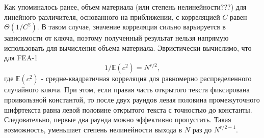 \documentclass[utf8x, 14pt]{G7-32} %
\begin{document}
Как упоминалось ранее, объем материала (или степень нелинейности???) для линейного различителя, основанного на приближении, с корреляцией $C$ равен $\Theta (1/C^2)$. В таком случае, значение корреляция сильно варьируется в зависимости от ключа, поэтому полученный результат нельзя напрямую использовать для вычисления объема материала. Эвристически вычислимо, что для FEA-1
\begin{equation}
\label{eqn:keyeq}
1/\mathbb{E}(c^2)=N^{r/2},\end{equation} 
где $\mathbb{E}(c^2)$ - средне-квадратичная корреляция для равномерно распределенного случайного ключа. При этом, если правая часть открытого текста фиксирована проивользной константой, то после двух раундов левая половина промежуточного шифртекста равна левой половине открытого текста с точностью до константы. Следовательно, первые два раунда можно эффективно пропустить. Такая возможность, уменьшает степень нелинейности выхода в $N$ раз до $N^{r/2-1}$.








\backmatter %





%

%
\end{document}
